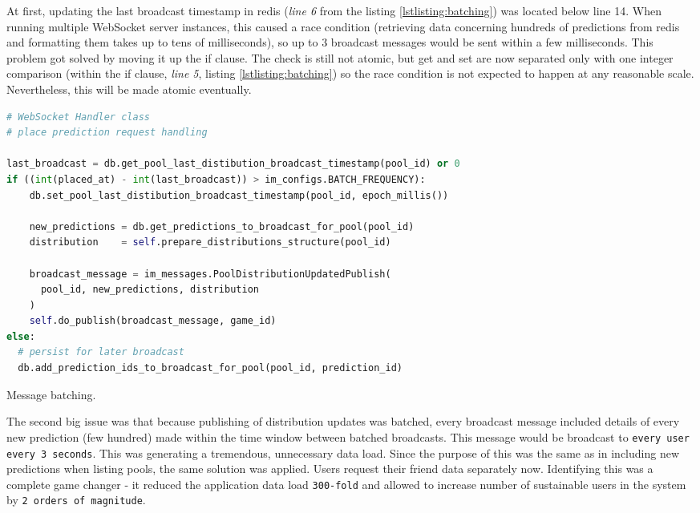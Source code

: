 \documentclass{uvamscse}
\begin{document}
At first, updating the last broadcast timestamp in redis (\textit{line 6} from the listing \ref{lstlisting:batching}) was located below line 14. When running multiple WebSocket server instances, this caused a race condition (retrieving data concerning hundreds of predictions from redis and formatting them takes up to tens of milliseconds), so up to 3 broadcast messages would be sent within a few milliseconds. This problem got solved by moving it up the if clause. The check is still not atomic, but get and set are now separated only with one integer comparison (within the if clause, \textit{line 5}, listing \ref{lstlisting:batching}) so the race condition is not expected to happen at any reasonable scale. Nevertheless, this will be made atomic eventually.

\begin{sourcecode}[h]
\begin{lstlisting}[style=mono,language=Python]
# WebSocket Handler class
# place prediction request handling

last_broadcast = db.get_pool_last_distibution_broadcast_timestamp(pool_id) or 0
if ((int(placed_at) - int(last_broadcast)) > im_configs.BATCH_FREQUENCY):
    db.set_pool_last_distibution_broadcast_timestamp(pool_id, epoch_millis())

    new_predictions = db.get_predictions_to_broadcast_for_pool(pool_id)
    distribution    = self.prepare_distributions_structure(pool_id)

    broadcast_message = im_messages.PoolDistributionUpdatedPublish(
      pool_id, new_predictions, distribution
    )
    self.do_publish(broadcast_message, game_id)
else:
  # persist for later broadcast
  db.add_prediction_ids_to_broadcast_for_pool(pool_id, prediction_id)
\end{lstlisting}
\caption{Message batching.}
\label{lstlisting:batching}
\end{sourcecode}

The second big issue was that because publishing of distribution updates was batched, every broadcast message included details of every new prediction (few hundred) made within the time window between batched broadcasts. This message would be broadcast to \texttt{every user every 3 seconds}. This was generating a tremendous, unnecessary data load. Since the purpose of this was the same as in including new predictions when listing pools, the same solution was applied. Users request their friend data separately now. Identifying this was a complete game changer - it reduced the application data load \texttt{300-fold} and allowed to increase number of sustainable users in the system by \texttt{2 orders of magnitude}.
\end{document}
